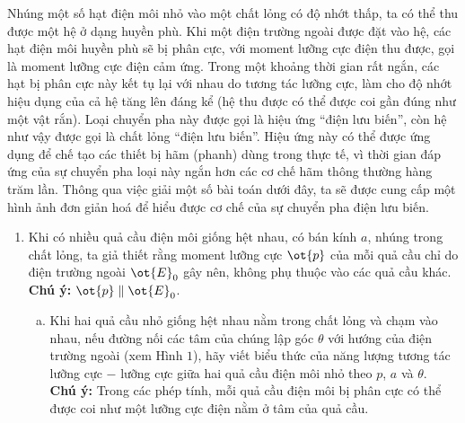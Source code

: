 \begin{vd}
\begin{center}
\end{center}
Nhúng một số hạt điện môi nhỏ vào một chất lỏng có độ nhớt thấp, ta có thể thu được một hệ ở dạng huyền phù. Khi một điện trường ngoài được đặt vào hệ, các hạt điện môi huyền phù sẽ bị phân cực, với moment lưỡng cực điện thu được, gọi là moment lưỡng cực điện cảm ứng. Trong một khoảng thời gian rất ngắn, các hạt bị phân cực này kết tụ lại với nhau do tương tác lưỡng cực, làm cho độ nhớt hiệu dụng của cả hệ tăng lên đáng kể (hệ thu được có thể được coi gần đúng như một vật rắn). Loại chuyển pha này được gọi là hiệu ứng ``điện lưu biến'', còn hệ như vậy được gọi là chất lỏng ``điện lưu biến''. Hiệu ứng này có thể được ứng dụng để chế tạo các thiết bị hãm (phanh) dùng trong thực tế, vì thời gian đáp ứng của sự chuyển pha loại này ngắn hơn các cơ chế hãm thông thường hàng trăm lần. Thông qua việc giải một số bài toán dưới đây, ta sẽ được cung cấp một hình ảnh đơn giản hoá để hiểu được cơ chế của sự chuyển pha điện lưu biến.
\begin{enumerate}[1)]
    \item Khi có nhiều quả cầu điện môi giống hệt nhau, có bán kính $a$, nhúng trong chất lỏng, ta giả thiết rằng moment lưỡng cực $\ot{p}$ của mỗi quả cầu chỉ do điện trường ngoài $\ot{E}_{0}$ gây nên, không phụ thuộc vào các quả cầu khác. \\ 
    \textbf{Chú ý:} $\ot{p} \parallel \ot{E}_{0}$.
    \begin{enumerate}[a)]
        \item Khi hai quả cầu nhỏ giống hệt nhau nằm trong chất lỏng và chạm vào nhau, nếu đường nối các tâm của chúng lập góc $\theta$ với hướng của điện trường ngoài (xem Hình $1$), hãy viết biểu thức của năng lượng tương tác lưỡng cực $-$ lưỡng cực giữa hai quả cầu điện môi nhỏ theo $p$, $a$ và $\theta$.\\ \textbf{Chú ý:} Trong các phép tính, mỗi quả cầu điện môi bị phân cực có thể được coi như một lưỡng cực điện nằm ở tâm của quả cầu.
        \begin{center}
\end{center}
\end{enumerate}
\end{enumerate}
\end{vd}
